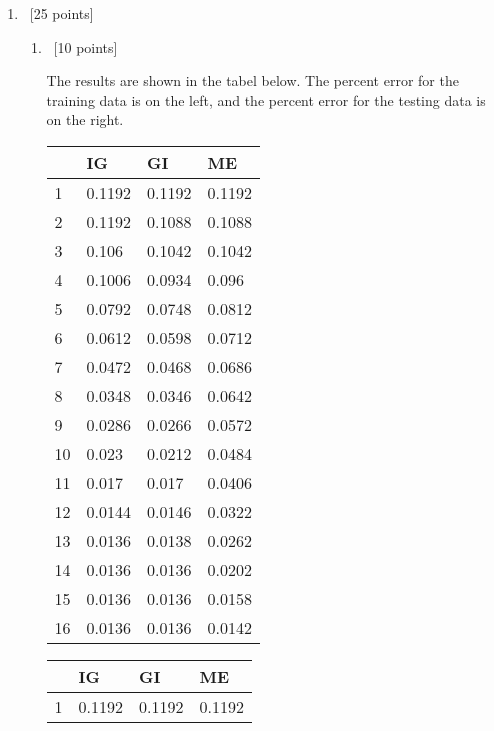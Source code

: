 \documentclass[12pt, fullpage,letterpaper]{article}
\begin{document}
\begin{enumerate}
\begin{enumerate}
\end{enumerate}


\item~[25 points] 
\begin{enumerate}
	\item~[10 points]
	
	The results are shown in the tabel below. The percent error for the training data is on the left, and the percent error for the testing data is on the right.

	\begin{tabular}{|l|l|l|l|}
		\hline
		   & IG & GI & ME\\ \hline
		1  & 0.1192           & 0.1192     & 0.1192         \\ \hline
		2  & 0.1192           & 0.1088     & 0.1088         \\ \hline
		3  & 0.106            & 0.1042     & 0.1042         \\ \hline
		4  & 0.1006           & 0.0934     & 0.096          \\ \hline
		5  & 0.0792           & 0.0748     & 0.0812         \\ \hline
		6  & 0.0612           & 0.0598     & 0.0712         \\ \hline
		7  & 0.0472           & 0.0468     & 0.0686         \\ \hline
		8  & 0.0348           & 0.0346     & 0.0642         \\ \hline
		9  & 0.0286           & 0.0266     & 0.0572         \\ \hline
		10 & 0.023            & 0.0212     & 0.0484         \\ \hline
		11 & 0.017            & 0.017      & 0.0406         \\ \hline
		12 & 0.0144           & 0.0146     & 0.0322         \\ \hline
		13 & 0.0136           & 0.0138     & 0.0262         \\ \hline
		14 & 0.0136           & 0.0136     & 0.0202         \\ \hline
		15 & 0.0136           & 0.0136     & 0.0158         \\ \hline
		16 & 0.0136           & 0.0136     & 0.0142         \\ \hline
		\end{tabular}                  
		\begin{tabular}{|l|l|l|l|}
			\hline
			   & IG & GI & ME \\ \hline
			1  & 0.1192           & 0.1192     & 0.1192         \\ \hline

\end{tabular}
\end{enumerate}
\end{enumerate}
\end{document}
